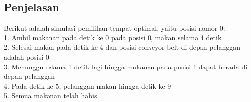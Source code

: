 \documentclass{article}
\begin{document}
\subsection*{Penjelasan}
Berikut adalah simulasi pemilihan tempat optimal, yaitu posisi nomor 0:\\

1. Ambil makanan pada detik ke 0 pada posisi 0, makan selama 4 detik\\
2. Selesai makan pada detik ke 4 dan posisi conveyor belt di depan pelanggan adalah posisi 0\\
3. Menunggu selama 1 detik lagi hingga makanan pada posisi 1 dapat berada di depan pelanggan\\
4. Pada detik ke 5, pelanggan makan hingga detik ke 9\\
5. Semua makanan telah habis\\

\pagebreak
\end{document}
